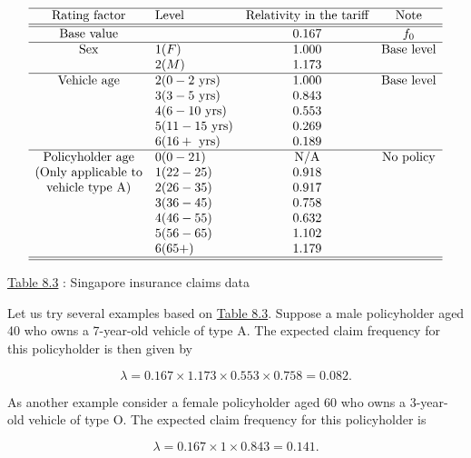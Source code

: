 \documentclass[]{book}
\theoremstyle{definition}
\theoremstyle{definition}
\theoremstyle{definition}
\theoremstyle{remark}
\begin{document}
\[\begin{matrix}
\begin{array}{clcc}
\hline
\text{Rating factor} & \text{Level} & \text{Relativity in the tariff} & \text{Note}\\ \hline\hline
\text{Base value}  &  & 0.167 & f_0\\ \hline
\text{Sex} & 1 (F) & 1.000 & \text{Base level}\\
 & 2 (M) & 1.173 &\\\hline
 \text{Vehicle age} & 2 (0-2\text{ yrs}) & 1.000 & \text{Base level}\\
  & 3 (3-5\text{ yrs}) & 0.843 \\
  & 4 (6-10\text{ yrs}) & 0.553 \\
  & 5 (11-15\text{ yrs}) & 0.269 \\
  & 6 (16+\text{ yrs}) & 0.189 &\\\hline
  \text{Policyholder age} & 0 (0-21) & \text{N/A} & \text{No policy} \\
  \text{(Only applicable to} & 1 (22-25) & 0.918 \\
 \text{vehicle type A)}  & 2 (26-35) & 0.917 \\
  & 3 (36-45) & 0.758 \\
  & 4 (46-55) & 0.632 \\
  & 5 (56-65) &  1.102\\
  & 6 (65+) & 1.179\\ \hline \hline
\end{array}
\end{matrix}\]

\protect\hyperlink{tab:8.3}{Table 8.3} : Singapore insurance claims data

Let us try several examples based on \protect\hyperlink{tab:8.3}{Table
8.3}. Suppose a male policyholder aged 40 who owns a 7-year-old vehicle
of type A. The expected claim frequency for this policyholder is then
given by

\begin{equation}
\lambda=0.167 \times 1.173 \times 0.553 \times 0.758 = 0.082.
\end{equation}

As another example consider a female policyholder aged 60 who owns a
3-year-old vehicle of type O. The expected claim frequency for this
policyholder is

\begin{equation}
\lambda=0.167 \times 1 \times 0.843  = 0.141.
\end{equation}
\end{document}

